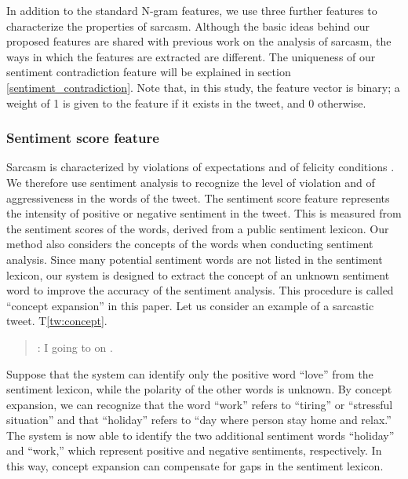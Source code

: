 \documentclass[english]{jnlp_1.4}
\def\extweet#1{}
\begin{document}
In addition to the standard N-gram features, we use three further features to characterize the properties of sarcasm.
Although the basic ideas behind our proposed features are shared with previous work on the analysis of sarcasm, the ways in which the features are extracted are different.
The uniqueness of our sentiment contradiction feature will be explained in section \ref{sentiment_contradiction}.
Note that, in this study, the feature vector is binary; a weight of 1 is given to the feature if it exists in the tweet, and 0 otherwise.


\subsubsection{Sentiment score feature}
\label{sentiment_score}

Sarcasm is characterized by violations of expectations and of felicity conditions \cite{Stringfellow_1994}.
We therefore use sentiment analysis to recognize the level of violation and of aggressiveness in the words of the tweet.
The sentiment score feature represents the intensity of positive or negative sentiment in the tweet.
This is measured from the sentiment scores of the words, derived from a public sentiment lexicon.
Our method also considers the concepts of the words when conducting sentiment analysis.
Since many potential sentiment words are not listed in the sentiment lexicon, our system is designed to extract the concept of an unknown sentiment word to improve the accuracy of the sentiment analysis.
This procedure is called ``concept expansion'' in this paper.
Let us consider an example of a sarcastic tweet. T\ref{tw:concept}.
\begin{quote}
  \setnoko
  \extweet{tw:concept}: I  going to  on .
\end{quote}
Suppose that the system can identify only the positive word ``love'' from the sentiment lexicon, while the polarity of the other words is unknown.
By concept expansion, we can recognize that the word ``work'' refers to ``tiring'' or ``stressful situation'' and that ``holiday'' refers to ``day where person stay home and relax.''
The system is now able to identify the two additional sentiment words ``holiday'' and ``work,'' which represent positive and negative sentiments, respectively.
In this way, concept expansion can compensate for gaps in the sentiment lexicon.
\end{document}
